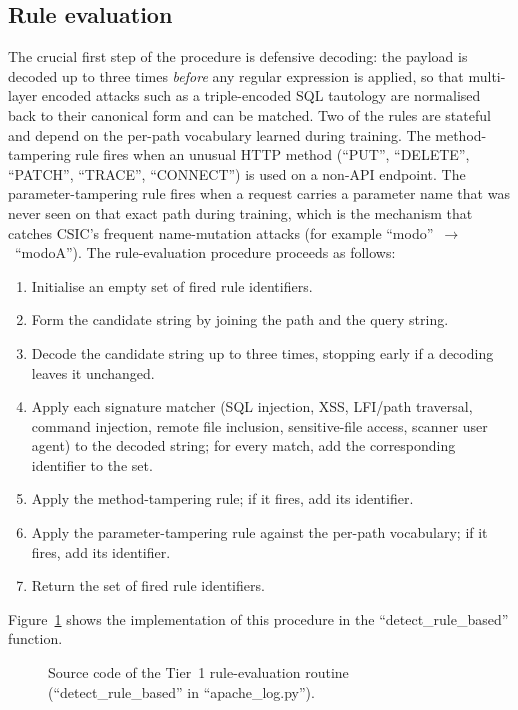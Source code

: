 \documentclass[12pt,a4paper]{report}
\begin{document}
\subsection{Rule evaluation}

The crucial first step of the procedure is defensive decoding: the payload
is decoded up to three times \emph{before} any regular expression is
applied, so that multi-layer encoded attacks such as a triple-encoded SQL
tautology are normalised back to their canonical form and can be matched.
Two of the rules are stateful and depend on the per-path vocabulary learned
during training. The method-tampering rule fires when an unusual HTTP method
(``PUT'', ``DELETE'', ``PATCH'', ``TRACE'',
``CONNECT'') is used on a non-API endpoint. The parameter-tampering
rule fires when a request carries a parameter name that was never seen on
that exact path during training, which is the mechanism that catches CSIC's
frequent name-mutation attacks (for example
``modo''~$\rightarrow$~``modoA''). The rule-evaluation procedure
proceeds as follows:

\begin{enumerate}[leftmargin=1.8em, itemsep=2pt]
  \item Initialise an empty set of fired rule identifiers.
  \item Form the candidate string by joining the path and the query string.
  \item Decode the candidate string up to three times, stopping early if a
        decoding leaves it unchanged.
  \item Apply each signature matcher (SQL injection, XSS, LFI/path
        traversal, command injection, remote file inclusion, sensitive-file
        access, scanner user agent) to the decoded string; for every match,
        add the corresponding identifier to the set.
  \item Apply the method-tampering rule; if it fires, add its identifier.
  \item Apply the parameter-tampering rule against the per-path vocabulary;
        if it fires, add its identifier.
  \item Return the set of fired rule identifiers.
\end{enumerate}

Figure~\ref{fig:code-detect} shows the implementation of this procedure in
the ``detect\_rule\_based'' function.

\begin{figure}[ht]
  \centering
  \caption{Source code of the Tier~1 rule-evaluation routine
           (``detect\_rule\_based'' in ``apache\_log.py'').}
  \label{fig:code-detect}
\end{figure}
\end{document}
